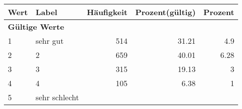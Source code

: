      \begin{longtable}{lXrrr}
     \toprule
     \textbf{Wert} & \textbf{Label} & \textbf{Häufigkeit} & \textbf{Prozent(gültig)} & \textbf{Prozent} \\
     \endhead
     \midrule
     \multicolumn{5}{l}{\textbf{Gültige Werte}}\\

     1 &
     \multicolumn{1}{X}{ sehr gut   } &


       \num{514} &
       \num[round-mode=places,round-precision=2]{31,21} &
         \num[round-mode=places,round-precision=2]{4,9} \\

     2 &
     \multicolumn{1}{X}{ 2   } &


       \num{659} &
       \num[round-mode=places,round-precision=2]{40,01} &
         \num[round-mode=places,round-precision=2]{6,28} \\

     3 &
     \multicolumn{1}{X}{ 3   } &


       \num{315} &
       \num[round-mode=places,round-precision=2]{19,13} &
         \num[round-mode=places,round-precision=2]{3} \\

     4 &
     \multicolumn{1}{X}{ 4   } &


       \num{105} &
       \num[round-mode=places,round-precision=2]{6,38} &
         \num[round-mode=places,round-precision=2]{1} \\

     5 &
     \multicolumn{1}{X}{ sehr schlecht   } &



\end{longtable}
